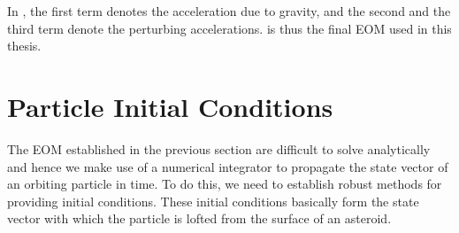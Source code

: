 In , the first term denotes the acceleration due to gravity, and the second and the third term denote the perturbing accelerations.  is thus the final \gls{EOM} used in this thesis.

\section{Particle Initial Conditions}
\label{sec:init_conditions}
The \gls{EOM} established in the previous section are difficult to solve analytically and hence we make use of a numerical integrator to propagate the state vector of an orbiting particle in time. To do this, we need to establish robust methods for providing initial conditions. These initial conditions basically form the state vector with which the particle is lofted from the surface of an asteroid.

